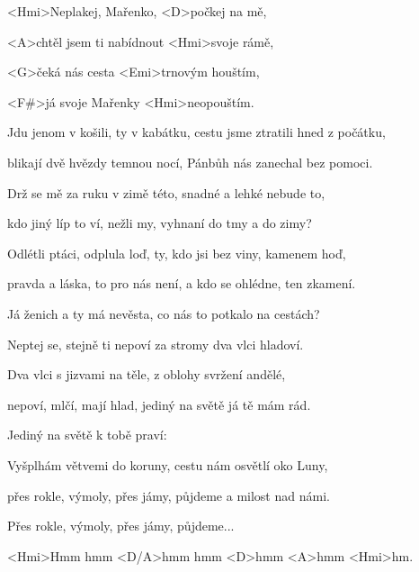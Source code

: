 

\zs
<Hmi>Neplakej, Mařenko, <D>počkej na mě,

<A>chtěl jsem ti nabídnout <Hmi>svoje rámě,

<G>čeká nás cesta <Emi>trnovým houštím,

<F#>já svoje Mařenky <Hmi>neopouštím.
\ks

\zs
Jdu jenom v košili, ty v kabátku, cestu jsme ztratili hned z počátku,

blikají dvě hvězdy temnou nocí, Pánbůh nás zanechal bez pomoci.
\ks

\zs
Drž se mě za ruku v zimě této, snadné a lehké nebude to,

kdo jiný líp to ví, nežli my, vyhnaní do tmy a do zimy?
\ks

\zs
Odlétli ptáci, odplula loď, ty, kdo jsi bez viny, kamenem hoď,

pravda a láska, to pro nás není, a kdo se ohlédne, ten zkamení.
\ks

\zs
Já ženich a ty má nevěsta, co nás to potkalo na cestách?

Neptej se, stejně ti nepoví za stromy dva vlci hladoví.
\ks

\zs
Dva vlci s jizvami na těle, z oblohy svržení andělé,

nepoví, mlčí, mají hlad, jediný na světě já tě mám rád.
\ks

\zs
Jediný na světě k tobě praví: 
\ks

\zs
Vyšplhám větvemi do koruny, cestu nám osvětlí oko Luny,

přes rokle, výmoly, přes jámy, půjdeme a milost nad námi.

Přes rokle, výmoly, přes jámy, půjdeme...

<Hmi>Hmm hmm <D/A>hmm hmm <D>hmm <A>hmm <Hmi>hm.
\ks

\kp
